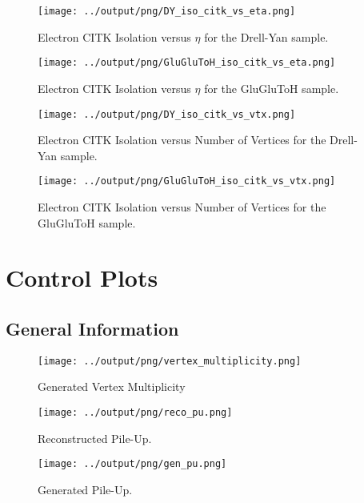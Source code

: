 \documentclass[11pt]{book}
\begin{document}
\begin{figure}[htb]
\centering
\texttt{[image: ../output/png/DY\_iso\_citk\_vs\_eta.png]}
\caption{Electron CITK Isolation versus $\eta$ for the Drell-Yan sample.}
\label{fig:dy_iso_citk_vs_eta}
\end{figure}

\begin{figure}[htb]
\centering
\texttt{[image: ../output/png/GluGluToH\_iso\_citk\_vs\_eta.png]}
\caption{Electron CITK Isolation versus $\eta$ for the GluGluToH sample.}
\label{fig:ggh_iso_citk_vs_eta}
\end{figure}

\begin{figure}[htb]
\centering
\texttt{[image: ../output/png/DY\_iso\_citk\_vs\_vtx.png]}
\caption{Electron CITK Isolation versus Number of Vertices for the Drell-Yan sample.}
\label{fig:dy_iso_citk_vs_vtx}
\end{figure}

\begin{figure}[htb]
\centering
\texttt{[image: ../output/png/GluGluToH\_iso\_citk\_vs\_vtx.png]}
\caption{Electron CITK Isolation versus Number of Vertices for the GluGluToH sample.}
\label{fig:ggh_iso_citk_vs_vtx}
\end{figure}
\clearpage

\chapter{Control Plots}
\section{General Information}
\begin{figure}[htb]
\centering
\texttt{[image: ../output/png/vertex\_multiplicity.png]}
\caption{Generated Vertex Multiplicity}
\label{fig:vertex_multiplicity}
\end{figure}

\begin{figure}[htb]
\centering
\texttt{[image: ../output/png/reco\_pu.png]}
\caption{Reconstructed Pile-Up.}
\label{fig:reco_reco_pu}
\end{figure}

\begin{figure}[htb]
\centering
\texttt{[image: ../output/png/gen\_pu.png]}
\caption{Generated Pile-Up.}
\label{fig:reco_gen_pu}
\end{figure}
\end{document}
